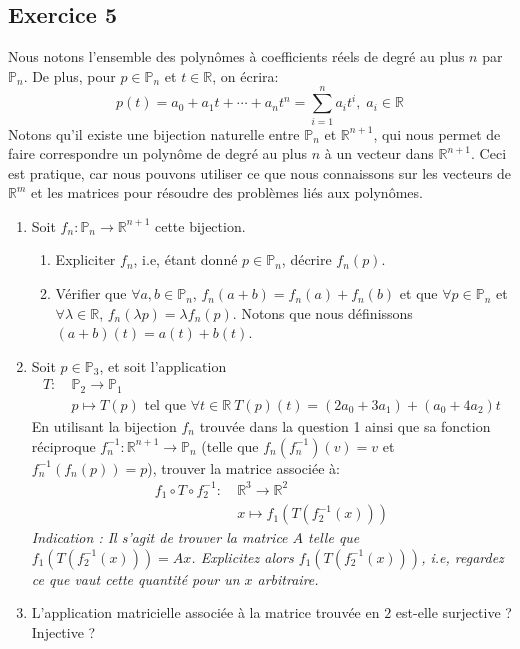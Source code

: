 \documentclass{article}
\newcommand{\R}{\mathbb{R}}
\newcommand{\Pn}{\mathbb{P}}
\begin{document}
\subsection*{Exercice 5}
\noindent Nous notons l'ensemble des polynômes à coefficients réels de degré au plus $n$ par $\Pn_n$. De plus, pour $p \in \Pn_n$ et $t \in \R$, on écrira:
$$p(t) = a_0 + a_1 t + \cdots + a_n t^n = \sum_{i=1}^{n} a_i t^i, \; a_i \in \R$$
Notons qu'il existe une bijection naturelle entre $\Pn_n$ et $\R^{n+1}$, qui nous permet de faire correspondre un polynôme de degré au plus $n$ à un vecteur dans $\R^{n+1}$. Ceci est pratique, car nous pouvons utiliser ce que nous connaissons sur les vecteurs de $\R^m$ et les matrices pour résoudre des problèmes liés aux polynômes. 
\begin{enumerate}
    \item Soit $f_n: \Pn_n \to \R^{n+1}$ cette bijection.
    \begin{enumerate}
        \item Expliciter $f_n$, i.e, étant donné $p \in \Pn_n$, décrire $f_n(p)$.
        \item Vérifier que $\forall a, b \in \Pn_n$, $f_n(a + b) = f_n(a) + f_n(b)$ et que $\forall p \in \Pn_n$ et $\forall \lambda \in \R$, $f_n(\lambda p) = \lambda f_n(p)$. Notons que nous définissons $(a+b)(t) = a(t) + b(t)$.
    \end{enumerate}
    \item Soit $p \in \Pn_3$, et soit l'application
    \begin{align*}
        T: \ &\Pn_2 \to \Pn_1\\
        &p \mapsto T(p) \text{ tel que }\forall t \in \R \ T(p)(t) = (2a_0 + 3a_1) + (a_0 + 4a_2)t
    \end{align*}
    En utilisant la bijection $f_n$ trouvée dans la question 1 ainsi que sa fonction réciproque $f_n^{-1} : \R^{n+1} \to \Pn_n$ (telle que $f_n(f_n^{-1})(v) = v$ et $f_n^{-1}(f_n(p)) =p $), trouver la matrice associée à: 
    \begin{align*}
        f_1 \circ T \circ f_2^{-1}: \ &\R^3 \to \R^2\\
        &x \mapsto f_1(T(f_2^{-1}(x)))
    \end{align*}
    \textit{Indication : Il s'agit de trouver la matrice $A$ telle que $f_1(T(f_2^{-1}(x)))= Ax$. Explicitez alors $f_1(T(f_2^{-1}(x)))$, i.e, regardez ce que vaut cette quantité pour un $x$ arbitraire.}
    \item L'application matricielle associée à la matrice trouvée en $2$ est-elle surjective ? Injective ?\\
    
\end{enumerate}
\end{document}
